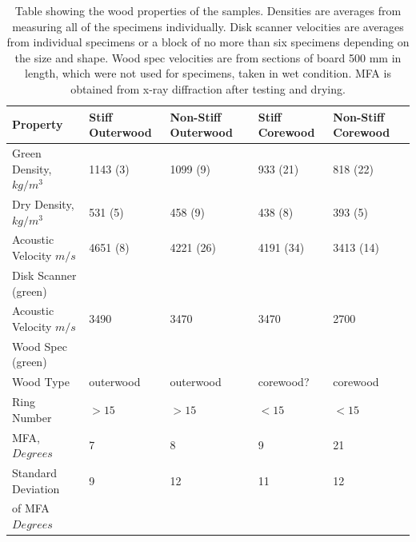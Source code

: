\documentclass[10pt]{article}
\begin{document}
\begin{table}
\caption[Wood properties]{Table showing the wood properties of the samples. Densities are averages from measuring all of the specimens individually. Disk scanner velocities are averages from individual specimens or a block of no more than six specimens depending on the size and shape. Wood spec velocities are from sections of board  500 mm in length, which were not used for specimens, taken in wet condition. MFA is obtained from x-ray diffraction after testing and drying. }
\label{table:init properties}
\begin{tabular}{l l l l l}
\hline
Property & Stiff Outerwood & Non-Stiff Outerwood & Stiff Corewood & Non-Stiff
Corewood\\
\hline
Green Density, \(kg/m^3\) & 1143 (3) & 1099 (9) & 933 (21) & 818 (22) \\
Dry Density,  \(kg/m^3\) & 531 (5)& 458 (9) & 438 (8) & 393 (5)\\
Acoustic Velocity \(m/s\) & 4651 (8) & 4221 (26)& 4191 (34)& 3413 (14)\\
Disk Scanner (green)      &          &          &          &           \\
Acoustic Velocity  \(m/s\) & 3490 & 3470 & 3470 & 2700\\
Wood Spec (green)          &      &      &      &      \\
Wood Type & outerwood & outerwood & corewood? & corewood \\
Ring Number & \(>15\) & \(>15\)&\(<15\) & \(<15\)  \\
MFA, \(Degrees\) & 7 & 8 & 9 & 21  \\
Standard Deviation & 9 & 12 & 11 & 12 \\
of MFA \(Degrees\)&   &  &   &   \\
\hline
\end{tabular}
\end{table}
\end{document}
